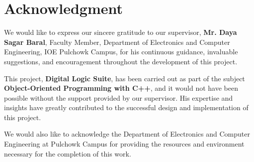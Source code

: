 \section*{Acknowledgment}

We would like to express our sincere gratitude to our supervisor, \textbf{Mr. Daya Sagar Baral}, Faculty Member, Department of Electronics and Computer Engineering, IOE Pulchowk Campus, for his continuous guidance, invaluable suggestions, and encouragement throughout the development of this project.

This project, \textbf{Digital Logic Suite}, has been carried out as part of the subject \textbf{Object-Oriented Programming with C++}, and it would not have been possible without the support provided by our supervisor. His expertise and insights have greatly contributed to the successful design and implementation of this project.

We would also like to acknowledge the Department of Electronics and Computer Engineering at Pulchowk Campus for providing the resources and environment necessary for the completion of this work.
